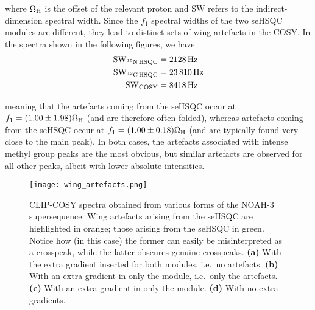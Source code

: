 where $\Omega_{\ce{H}}$ is the offset of the relevant proton and $\mathrm{SW}$ refers to the indirect-dimension spectral width.
Since the $f_1$ spectral widths of the two seHSQC modules are different, they lead to distinct sets of wing artefacts in the COSY.
In the spectra shown in the following figures, we have
\begin{align*}
    \mathrm{SW_{\ce{^15N}\,HSQC}} &= \SI{2128}{\Hz} \\
    \mathrm{SW_{\ce{^13C}\,HSQC}} &= \SI{23810}{\Hz} \\
    \mathrm{SW_{COSY}}            &= \SI{8418}{\Hz}
\end{align*}

meaning that the artefacts coming from the \nitrogen{} seHSQC occur at $f_1 = (1.00 \pm 1.98) \Omega_{\ce{H}}$ (and are therefore often folded), whereas artefacts coming from the \carbon{} seHSQC occur at $f_1 = (1.00 \pm 0.18) \Omega_{\ce{H}}$ (and are typically found very close to the main peak).
In both cases, the artefacts associated with intense methyl group peaks are the most obvious, but similar artefacts are observed for all other peaks, albeit with lower absolute intensities.

\begin{figure}
    \centering
    \texttt{[image: wing\_artefacts.png]}
    \caption{
        CLIP-COSY spectra obtained from various forms of the NOAH-3  supersequence.
        Wing artefacts arising from the \nitrogen{} seHSQC are highlighted in orange; those arising from the \carbon{} seHSQC in green.
        Notice how (in this case) the former can easily be misinterpreted as a crosspeak, while the latter obscures genuine crosspeaks.
        \textbf{(a)} With the extra gradient inserted for both modules, i.e.\ no artefacts.
        \textbf{(b)} With an extra gradient in only the \nitrogen{} module, i.e.\ only the \carbon{} artefacts.
        \textbf{(c)} With an extra gradient in only the \carbon{} module.
        \textbf{(d)} With no extra gradients.
        \grami{}
    }
    \label{fig:wing_artefacts}
\end{figure}

